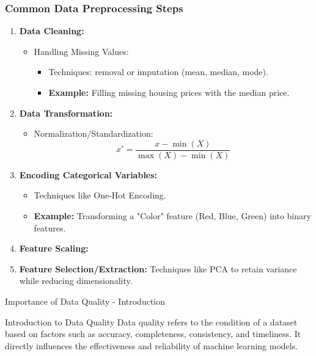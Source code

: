 \documentclass[aspectratio=169]{beamer}
\begin{document}
\begin{frame}[fragile]
    \frametitle{Common Data Preprocessing Steps}
    \begin{enumerate}
        \item \textbf{Data Cleaning:}
        \begin{itemize}
            \item Handling Missing Values:
            \begin{itemize}
                \item Techniques: removal or imputation (mean, median, mode).
                \item \textbf{Example:} Filling missing housing prices with the median price.
            \end{itemize}
        \end{itemize}

        \item \textbf{Data Transformation:}
        \begin{itemize}
            \item Normalization/Standardization:
            \begin{equation}
                x' = \frac{x - \min(X)}{\max(X) - \min(X)}
            \end{equation}
        \end{itemize}

        \item \textbf{Encoding Categorical Variables:}
        \begin{itemize}
            \item Techniques like One-Hot Encoding.
            \item \textbf{Example:} Transforming a "Color" feature (Red, Blue, Green) into binary features.
        \end{itemize}
        
        \item \textbf{Feature Scaling:}
        \item \textbf{Feature Selection/Extraction:} Techniques like PCA to retain variance while reducing dimensionality.
    \end{enumerate}
\end{frame}

\begin{frame}[fragile]{Importance of Data Quality - Introduction}
    \begin{block}{Introduction to Data Quality}
        Data quality refers to the condition of a dataset based on factors such as accuracy, completeness, consistency, and timeliness. It directly influences the effectiveness and reliability of machine learning models.
    \end{block}
\end{frame}
\end{document}
